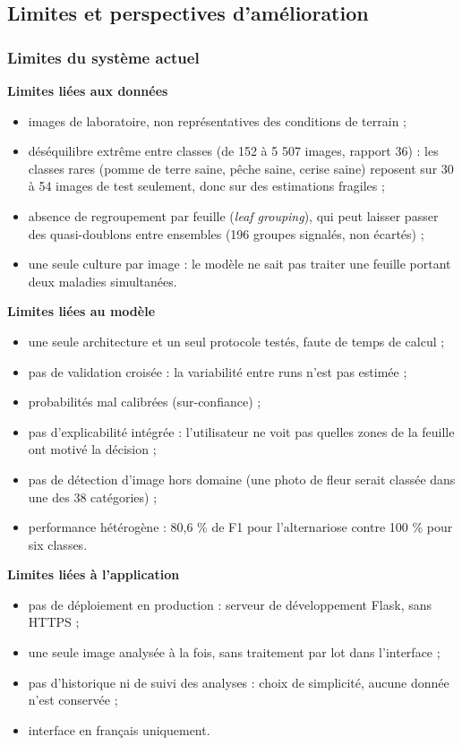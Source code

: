 \documentclass[10pt,a4paper]{article}
\begin{document}
\subsection{Limites et perspectives d'amélioration}

\subsubsection{Limites du système actuel}

\textbf{Limites liées aux données}

\begin{itemize}
\item images de laboratoire, non représentatives des conditions de terrain ;
\item déséquilibre extrême entre classes (de 152 à 5 507 images, rapport 36) : les classes rares (pomme de terre saine, pêche saine, cerise saine) reposent sur 30 à 54 images de test seulement, donc sur des estimations fragiles ;
\item absence de regroupement par feuille (\emph{leaf grouping}), qui peut laisser passer des quasi-doublons entre ensembles (196 groupes signalés, non écartés) ;
\item une seule culture par image : le modèle ne sait pas traiter une feuille portant deux maladies simultanées.
\end{itemize}

\textbf{Limites liées au modèle}

\begin{itemize}
\item une seule architecture et un seul protocole testés, faute de temps de calcul ;
\item pas de validation croisée : la variabilité entre runs n'est pas estimée ;
\item probabilités mal calibrées (sur-confiance) ;
\item pas d'explicabilité intégrée : l'utilisateur ne voit pas quelles zones de la feuille ont motivé la décision ;
\item pas de détection d'image hors domaine (une photo de fleur serait classée dans une des 38 catégories) ;
\item performance hétérogène : 80,6 \% de F1 pour l'alternariose contre 100 \% pour six classes.
\end{itemize}

\textbf{Limites liées à l'application}

\begin{itemize}
\item pas de déploiement en production : serveur de développement Flask, sans HTTPS ;
\item une seule image analysée à la fois, sans traitement par lot dans l'interface ;
\item pas d'historique ni de suivi des analyses : choix de simplicité, aucune donnée n'est conservée ;
\item interface en français uniquement.
\end{itemize}
\end{document}
